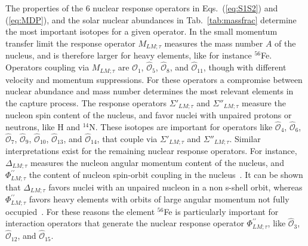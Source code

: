 \documentclass[11pt,a4paper]{article}
\begin{document}
The properties of the 6 nuclear response operators in Eqs.~(\ref{eq:S1S2}) and (\ref{eq:MDP}), and the solar nuclear abundances in Tab.~\ref{tab:massfrac} determine the most important isotopes for a given operator. In the small momentum transfer limit the response operator $M_{LM;\tau}$ measures the mass number $A$ of the nucleus, and is therefore larger for heavy elements, like for instance $^{56}$Fe. Operators coupling via $M_{LM;\tau}$ are $\hat{\mathcal{O}}_1$, $\hat{\mathcal{O}}_{5}$, $\hat{\mathcal{O}}_{8}$, and $\hat{\mathcal{O}}_{11}$, though with different velocity and momentum suppressions. For these operators a compromise between nuclear abundance and mass number determines the most relevant elements in the capture process. The response operators $\Sigma'_{LM;\tau}$ and $\Sigma''_{LM;\tau}$ measure the nucleon spin content of the nucleus, and favor nuclei with unpaired protons or neutrons, like H and $^{14}$N. These isotopes are important for operators like $\hat{\mathcal{O}}_4$, $\hat{\mathcal{O}}_{6}$, $\hat{\mathcal{O}}_7$, $\hat{\mathcal{O}}_{9}$, $\hat{\mathcal{O}}_{10}$, $\hat{\mathcal{O}}_{13}$, and $\hat{\mathcal{O}}_{14}$, that couple via $\Sigma'_{LM;\tau}$ and $\Sigma''_{LM;\tau}$. Similar interpretations exist for the remaining nuclear response operators. For instance, $\Delta_{LM;\tau}$ measures the nucleon angular momentum content of the nucleus, and $\Phi^{\prime \prime}_{LM;\tau}$ the content of nucleon spin-orbit coupling in the nucleus~\cite{Fitzpatrick:2012ib}. It can be shown that $\Delta_{LM;\tau}$ favors nuclei with an unpaired nucleon in a non s-shell orbit, whereas $\Phi^{\prime \prime}_{LM;\tau}$ favors heavy elements with orbits of large angular momentum not fully occupied~\cite{Fitzpatrick:2012ib}. For these reasons  the element $^{56}$Fe is particularly important for interaction operators that generate the nuclear response operator $\Phi^{\prime \prime}_{LM;\tau}$, like $\hat{\mathcal{O}}_3$, $\hat{\mathcal{O}}_{12}$, and $\hat{\mathcal{O}}_{15}$.
\end{document}
